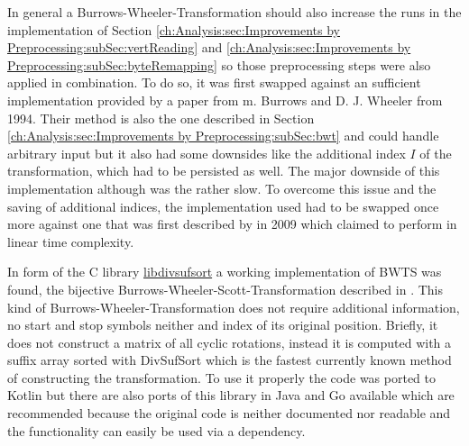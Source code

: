 \par{
In general a Burrows-Wheeler-Transformation should also increase the runs in the implementation of Section \ref{ch:Analysis:sec:Improvements by Preprocessing:subSec:vertReading} and \ref{ch:Analysis:sec:Improvements by Preprocessing:subSec:byteRemapping} so those preprocessing steps were also applied in combination. To do so, it was first swapped against an sufficient implementation provided by a paper from m. Burrows and D. J. Wheeler \cite{Burrows94} from 1994. Their method is also the one described in Section \ref{ch:Analysis:sec:Improvements by Preprocessing:subSec:bwt} and could handle arbitrary input but it also had some downsides like the additional index $I$ of the transformation, which had to be persisted as well. The major downside of this implementation although was the rather slow. To overcome this issue and the saving of additional indices, the implementation used had to be swapped once more against one that was first described by \cite{Burrows-linear-time} in 2009 which claimed to perform in linear time complexity.
}
\par{
In form of the C library \href{https://code.google.com/archive/p/libdivsufsort}{libdivsufsort} a working implementation of BWTS was found, the bijective Burrows-Wheeler-Scott-Transformation described in \cite{DBLP:journals/corr/abs-1201-3077}. This kind of Burrows-Wheeler-Transformation does not require additional information, no start and stop symbols neither and index of its original position. Briefly, it does not construct a matrix of all cyclic rotations, instead it is computed with a suffix array sorted with DivSufSort\cite{DBLP:journals/corr/abs-1710-01896} which is the fastest currently known method of constructing the transformation. To use it properly the code was ported to Kotlin but there are also ports of this library in Java and Go available which are recommended because the original code is neither documented nor readable and the functionality can easily be used via a dependency.
}
